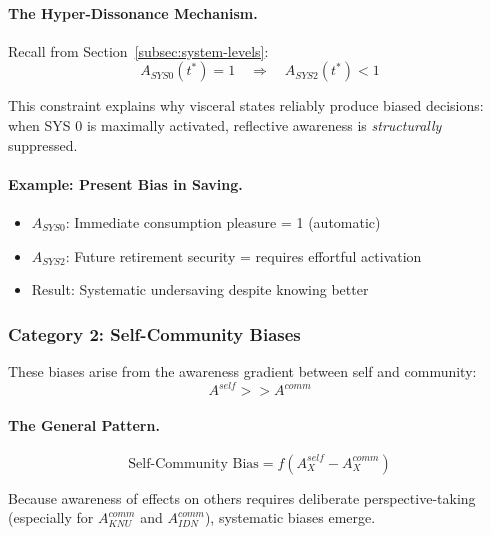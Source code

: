 \paragraph{The Hyper-Dissonance Mechanism.}
Recall from Section~\ref{subsec:system-levels}:
\begin{equation}
A_{SYS0}(t^*) = 1 \quad \Rightarrow \quad A_{SYS2}(t^*) < 1
\end{equation}

This constraint explains why visceral states reliably produce biased decisions:
when SYS 0 is maximally activated, reflective awareness is \emph{structurally}
suppressed.

\paragraph{Example: Present Bias in Saving.}
\begin{itemize}
\item $A_{SYS0}$: Immediate consumption pleasure = 1 (automatic)
\item $A_{SYS2}$: Future retirement security = requires effortful activation
\item Result: Systematic undersaving despite knowing better
\end{itemize}

\subsubsection{Category 2: Self-Community Biases}

These biases arise from the awareness gradient between self and community:
\begin{equation}
A^{self} >> A^{comm}
\end{equation}

\paragraph{The General Pattern.}
\begin{equation}
\text{Self-Community Bias} = f(A^{self}_X - A^{comm}_X)
\end{equation}

Because awareness of effects on others requires deliberate perspective-taking
(especially for $A^{comm}_{KNU}$ and $A^{comm}_{IDN}$), systematic biases emerge.

